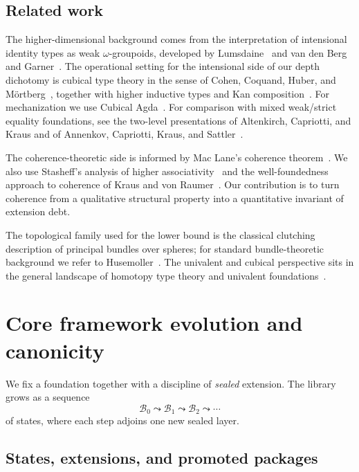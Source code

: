 \documentclass{lmcs}
\newcommand{\B}{\mathcal{B}}
\begin{document}
\subsection{Related work}
\label{sec:related}

The higher-dimensional background comes from the interpretation of intensional identity types as weak $\omega$-groupoids, developed by Lumsdaine~\cite{lumsdaine} and van den Berg and Garner~\cite{vdberg-garner}. The operational setting for the intensional side of our depth dichotomy is cubical type theory in the sense of Cohen, Coquand, Huber, and M\"ortberg~\cite{cubical}, together with higher inductive types and Kan composition~\cite{cchm-hits}. For mechanization we use Cubical Agda~\cite{cubical-agda}. For comparison with mixed weak/strict equality foundations, see the two-level presentations of Altenkirch, Capriotti, and Kraus and of Annenkov, Capriotti, Kraus, and Sattler~\cite{altenkirch-strict,annenkov-2ltt}.

The coherence-theoretic side is informed by Mac Lane's coherence theorem~\cite{maclane-coherence}. We also use Stasheff's analysis of higher associativity~\cite{stasheff} and the well-foundedness approach to coherence of Kraus and von Raumer~\cite{kraus-vonraumer}. Our contribution is to turn coherence from a qualitative structural property into a quantitative invariant of extension debt.

The topological family used for the lower bound is the classical clutching description of principal bundles over spheres; for standard bundle-theoretic background we refer to Husemoller~\cite{husemoller}. The univalent and cubical perspective sits in the general landscape of homotopy type theory and univalent foundations~\cite{hott}.

\section{Core framework evolution and canonicity}
\label{sec:framework}

We fix a foundation together with a discipline of \emph{sealed} extension. The library grows as a sequence
\[
  \B_0 \leadsto \B_1 \leadsto \B_2 \leadsto \cdots
\]
of states, where each step adjoins one new sealed layer.

\subsection{States, extensions, and promoted packages}
\end{document}
